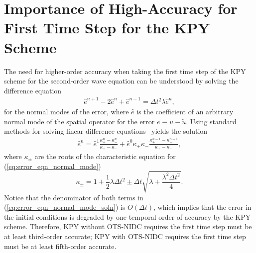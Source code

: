 \documentclass[fleqn,12pt,twoside]{article}
\newcommand{\beq}{\begin{equation}}
\newcommand{\eeq}{\end{equation}}
\newcommand{\bea}{\begin{eqnarray}}
\newcommand{\eea}{\end{eqnarray}}
\def\tu{\tilde{u}}
\def\he{\hat{e}}
\def\dt{\Delta t}
\begin{document}
\section{Importance of High-Accuracy for First Time Step for the KPY Scheme
         \label{appendix:KPY_analysis} }
The need for higher-order accuracy when taking the first time step of the KPY 
scheme for the second-order wave equation can be understood by solving the 
difference equation 
\bea
  \he^{n+1} - 2 \he^{n} + \he^{n-1} = \dt^2 \lambda \he^{n}
  \label{eq:error_eqn_normal_mode},
\eea
for the normal modes of the error, where $\he$ is the coefficient of an 
arbitrary normal mode of the spatial operator for the error 
$e \equiv u - \tu$.  Using standard methods for solving linear difference
equations~\cite{carrier_pearson_book} yields the solution
\bea
  \he^n = \he^1 \frac{\kappa_+^n - \kappa_-^n}{\kappa_+ - \kappa_-}
        + \he^0 \kappa_+ \kappa_-
          \frac{\kappa_+^{n-1} - \kappa_-^{n-1}}{\kappa_+ - \kappa_-},
  \label{eq:error_eqn_normal_mode_soln}
\eea
where $\kappa_\pm$ are the roots of the characteristic equation for
(\ref{eq:error_eqn_normal_mode})~\cite{kreiss2002}
\beq
  \kappa_\pm = 1 + \frac{1}{2} \lambda \dt^2
             \pm \dt \sqrt{\lambda + \frac{\lambda^2 \dt^2}{4}}.
\eeq
Notice that the denominator of both terms in
(\ref{eq:error_eqn_normal_mode_soln}) is $O(\dt)$, which implies that the
error in the initial conditions is degraded by one temporal order of accuracy
by the KPY scheme.  Therefore, KPY without OTS-NIDC requires the first time 
step must be at least third-order accurate; KPY with OTS-NIDC requires the 
first time step must be at least fifth-order accurate.


%
\end{document}
